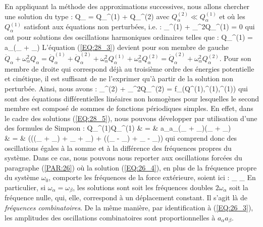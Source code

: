 En appliquant la m\'{e}thode des approximations successives, nous allons chercher une solution du type :
\be
	Q_{\alpha} = Q_{\alpha}^{(1)} + Q_{\alpha}^{(2)}\label{EQ:28_4}
\ee
avec $Q_{\alpha}^{(2)} \ll Q_{\alpha}^{(1)}$ et o\`{u} les $Q_{\alpha}^{(1)}$ satisfont aux \'{e}quations non perturb\'{e}es, i.e. :
\benn
	\forall\alpha\text{, }_{\alpha}^{(1)} + \omega_{\alpha}^{2}Q_{\alpha}^{(1)} = 0
\eenn
qui ont pour solutions des oscillations harmoniques ordinaires telles que :
\be
	Q_{\alpha}^{(1)} = a_{\alpha}\cos(\omega_{\alpha} + \alpha_{\alpha})\label{EQ:28_5}
\ee
L'\'{e}quation (\ref{EQ:28_3}) devient pour son membre de gauche $\ddot{Q}_{\alpha} + \omega_{\alpha}^{2}Q_{\alpha} = \ddot{Q}_{\alpha}^{(1)} + \ddot{Q}_{\alpha}^{(2)} + \omega_{\alpha}^{2}Q_{\alpha}^{(1)} + \omega_{\alpha}^{2}Q_{\alpha}^{(2)} = \ddot{Q}_{\alpha}^{(2)} + \omega_{\alpha}^{2}Q_{\alpha}^{(2)}$. Pour son membre de droite qui correspond d\'{e}j\`{a} au troisi\`{e}me ordre des \'{e}nergies potentielle et cin\'{e}tique, il est suffisant de ne l'exprimer qu'\`{a} partir de la solution non perturb\'{e}e. Ainsi, nous avons :
\be
	\forall\alpha\text{, }_{\alpha}^{(2)} + \omega_{\alpha}^{2}Q_{\alpha}^{(2)} = f_{\alpha}(Q^{(1)},^{(1)},^{(1)})\label{EQ:28_6}
\ee
qui sont des \'{e}quations diff\'{e}rentielles lin\'{e}aires non homog\`{e}nes pour lesquelles le second membre est compos\'{e} de sommes de fonctions p\'{e}riodiques simples. En effet, dans le cadre des solutions (\ref{EQ:28_5}), nous pouvons d\'{e}velopper par utilisation d'une des formules de Simpson :
\bea
	Q_{\alpha}^{(1)}Q_{\beta}^{(1)} & = & a_{\alpha}a_{\beta}\cos(\omega_{\alpha} + \alpha_{\alpha})\cos(\omega_{\beta} + \alpha_{\beta}) \nonumber \\
	& = & \left(\cos((\omega_{\alpha} + \omega_{\beta}) + \alpha_{\alpha} + \alpha_{\beta}) + \cos((\omega_{\alpha} - \omega_{\beta}) + \alpha_{\alpha} - \alpha_{\beta})\right) \nonumber
\eea
qui comprend donc des oscillations \'{e}gales \`{a} la somme et \`{a} la diff\'{e}rence des fr\'{e}quences propres du syst\`{e}me. Dans ce cas, nous pouvons nous reporter aux oscillations forc\'{e}es du paragraphe (\ref{PAR:26}) o\`{u} la solution (\ref{EQ:26_4}), en plus de la fr\'{e}quence propre du syst\`{e}me $\omega_{0}$, comporte les fr\'{e}quences de la force ext\'{e}rieure, soient ici :
\be
	\omega_{\alpha} \pm \omega_{\beta}\label{EQ:28_7}
\ee
En particulier, si $\omega_{\alpha} = \omega_{\beta}$, les solutions sont soit les fr\'{e}quences doubles $2\omega_{\alpha}$ soit la fr\'{e}quence nulle, qui, elle, correspond \`{a} un d\'{e}placement constant. Il s'agit l\`{a} de \emph{fr\'{e}quences combinatoires}. De la m\^{e}me mani\`{e}re, par identification \`{a} (\ref{EQ:26_3}), les amplitudes des oscillations combinatoires sont proportionnelles \`{a} $a_{\alpha}a_{\beta}$.

